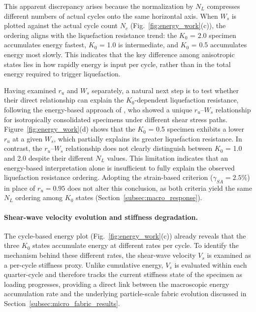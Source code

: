 \documentclass[a4paper,fleqn]{cas-sc}
\newcommand{\Kzero}{\ensuremath{K_0}}
\newcommand{\Vs}{\ensuremath{V_s}}
\newcommand{\ru}{\ensuremath{r_u}}
\begin{document}
This apparent discrepancy arises because the normalization by $N_L$ compresses different numbers of actual cycles onto the same horizontal axis. When $W_s$ is plotted against the actual cycle count $N_c$ (Fig.~\ref{fig:energy_work}(c)), the ordering aligns with the liquefaction resistance trend: the \Kzero{} = 2.0 specimen accumulates energy fastest, \Kzero{} = 1.0 is intermediate, and \Kzero{} = 0.5 accumulates energy most slowly. This indicates that the key difference among anisotropic states lies in how rapidly energy is input per cycle, rather than in the total energy required to trigger liquefaction.

Having examined $\ru$ and $W_s$ separately, a natural next step is to test whether their direct relationship can explain the \Kzero{}-dependent liquefaction resistance, following the energy-based approach of \citet{TowhataIshihara1985}, who showed a unique $\ru$--$W_s$ relationship for isotropically consolidated specimens under different shear stress paths. Figure~\ref{fig:energy_work}(d) shows that the \Kzero{} = 0.5 specimen exhibits a lower $\ru$ at a given $W_s$, which partially explains its greater liquefaction resistance. In contrast, the $\ru$--$W_s$ relationship does not clearly distinguish between \Kzero{} = 1.0 and 2.0 despite their different $N_L$ values. This limitation indicates that an energy-based interpretation alone is insufficient to fully explain the observed liquefaction resistance ordering. Adopting the strain-based criterion ($\gamma_{SA}=2.5\%$) in place of $\ru=0.95$ does not alter this conclusion, as both criteria yield the same $N_L$ ordering among \Kzero{} states (Section~\ref{subsec:macro_response}).

\paragraph{Shear-wave velocity evolution and stiffness degradation.}
The cycle-based energy plot (Fig.~\ref{fig:energy_work}(c)) already reveals that the three \Kzero{} states accumulate energy at different rates per cycle. To identify the mechanism behind these different rates, the shear-wave velocity \Vs{} is examined as a per-cycle stiffness proxy. Unlike cumulative energy, \Vs{} is evaluated within each quarter-cycle and therefore tracks the current stiffness state of the specimen as loading progresses, providing a direct link between the macroscopic energy accumulation rate and the underlying particle-scale fabric evolution discussed in Section~\ref{subsec:micro_fabric_results}.
\end{document}
